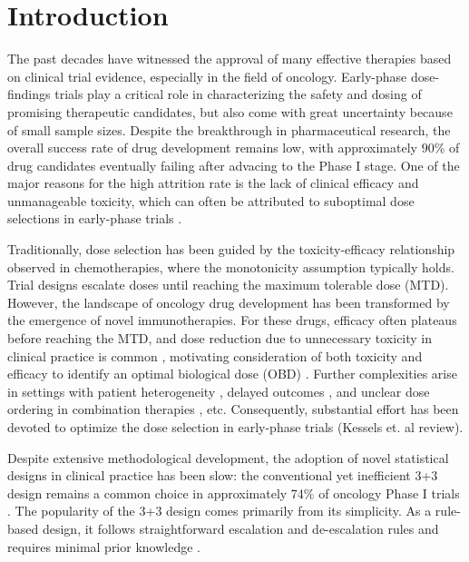 \documentclass[11pt]{article}
\begin{document}
\section{Introduction}
The past decades have witnessed the approval of many effective therapies based on clinical trial evidence, especially in the field of oncology. Early-phase dose-findings trials play a critical role in characterizing the safety and dosing of promising therapeutic candidates, but also come with great uncertainty because of small sample sizes. Despite the breakthrough in pharmaceutical research, the overall success rate of drug development remains low, with approximately $90\%$ of drug candidates eventually failing after advacing to the Phase I stage. One of the major reasons for the high attrition rate is the lack of clinical efficacy and unmanageable toxicity, which can often be attributed to suboptimal dose selections in early-phase trials \parencite{drug_failure}. 

Traditionally, dose selection has been guided by the toxicity-efficacy relationship observed in chemotherapies, where the monotonicity assumption typically holds. Trial designs escalate doses until reaching the maximum tolerable dose (MTD). However, the landscape of oncology drug development has been transformed by the emergence of novel immunotherapies. For these drugs, efficacy often plateaus before reaching the MTD, and dose reduction due to unnecessary toxicity in clinical practice is common \parencite{agrawal_nivolumab_2016,bekaii-saab_regorafenib_2019,fujimoto_phase_2017}, motivating consideration of both toxicity and efficacy to identify an optimal biological dose (OBD) \parencite{MTD_OBD, OBD_clinical_efficacy}. Further complexities arise in settings with patient heterogeneity \parencite{wages2015phase,guo2022bayesian,guo2022bipse}, delayed outcomes \parencite{TITE-CRM,TITE-BOIN12}, and unclear dose ordering in combination therapies \parencite{thall2003dose,BOINcomb}, etc. Consequently, substantial effort has been devoted to optimize the dose selection in early-phase trials (Kessels et. al review).

Despite extensive methodological development, the adoption of novel statistical designs in clinical practice has been slow: the conventional yet inefficient 3+3 design remains a common choice in approximately 74\% of oncology Phase I trials \parencite{review_phase1}. The popularity of the 3+3 design comes primarily from its simplicity. As a rule-based design, it follows straightforward escalation and de-escalation rules and requires minimal prior knowledge \parencite{rule_based_design}. 
\end{document}
